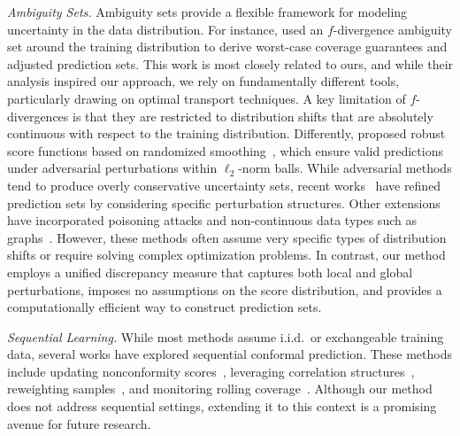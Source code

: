 \noindent\emph{Ambiguity Sets.} Ambiguity sets provide a flexible framework for modeling uncertainty in the data distribution. For instance, \cite{cauchois2024robust} used an $f$-divergence ambiguity set around the training distribution to derive worst-case coverage guarantees and adjusted prediction sets. This work is most closely related to ours, and while their analysis inspired our approach, we rely on fundamentally different tools, particularly drawing on optimal transport techniques. A key limitation of $f$-divergences is that they are restricted to distribution shifts that are absolutely continuous with respect to the training distribution. Differently, \cite{Gendler_2022} proposed robust score functions based on randomized smoothing~\cite{Cohen_2019, Kumar_2020}, which ensure valid predictions under adversarial perturbations within $\ell_2$-norm balls. While adversarial methods tend to produce overly conservative uncertainty sets, recent works~\cite{Yan_2024, Ghosh_2023, Clarkson_2024} have refined prediction sets by considering specific perturbation structures. Other extensions have incorporated poisoning attacks and non-continuous data types such as graphs~\cite{Zargarbashi_2024}. However, these methods often assume very specific types of distribution shifts or require solving complex optimization problems. In contrast, our method employs a unified discrepancy measure that captures both local and global perturbations, imposes no assumptions on the score distribution, and provides a computationally efficient way to construct prediction sets.

\medskip

\noindent\emph{Sequential Learning.} While most methods assume i.i.d.\ or exchangeable training data, several works have explored sequential conformal prediction. These methods include updating nonconformity scores~\cite{Xu_2021}, leveraging correlation structures~\cite{chernozhukov_2018}, reweighting samples~\cite{Xu_2023, Barber_2023}, and monitoring rolling coverage~\cite{Gibbs_2021, Gibbs_2022, Zaffran_2022, Bastani_2022}. Although our method does not address sequential settings, extending it to this context is a promising avenue for future research.





